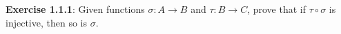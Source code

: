\documentclass[a4paper]{article}
\begin{document}
\begin{myparindent}{0pt}

\textbf{Exercise 1.1.1}:
Given functions $\sigma: A \rightarrow B$ and $\tau: B \rightarrow C$,
prove that if $\tau \circ \sigma$ is injective, then so is $\sigma$.

\end{myparindent}
\end{document}
